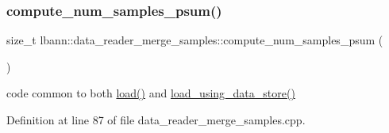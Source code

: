 \subsubsection{\texorpdfstring{compute\+\_\+num\+\_\+samples\+\_\+psum()}{compute\_num\_samples\_psum()}}
{\footnotesize\ttfamily size\+\_\+t lbann\+::data\+\_\+reader\+\_\+merge\+\_\+samples\+::compute\+\_\+num\+\_\+samples\+\_\+psum (\begin{DoxyParamCaption}{ }\end{DoxyParamCaption})\hspace{0.3cm}{\ttfamily [protected]}}



code common to both \hyperlink{classlbann_1_1data__reader__merge__samples_ab3554341417f5eba95b9c1098af40410}{load()} and \hyperlink{classlbann_1_1data__reader__merge__samples_ad45275b73fcbca47b74a9c9767f69bc9}{load\+\_\+using\+\_\+data\+\_\+store()} 



Definition at line 87 of file data\+\_\+reader\+\_\+merge\+\_\+samples.\+cpp.


